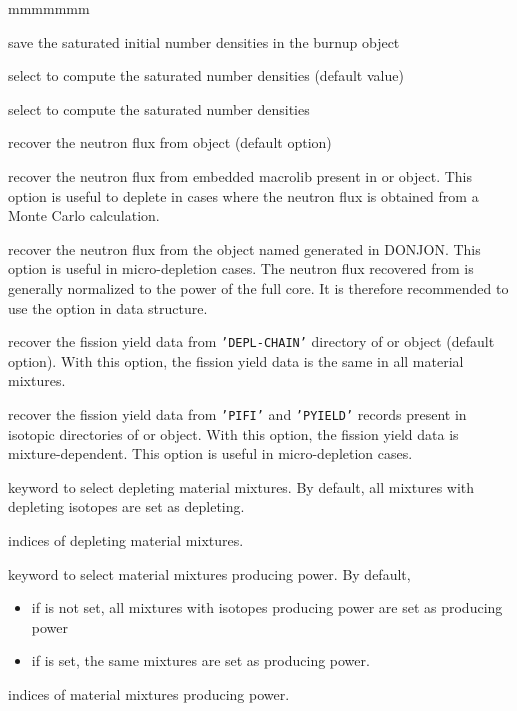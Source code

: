 \begin{ListeDeDescription}{mmmmmmm}
\item[\moc{SAT}]  save the saturated initial number densities in the {\sc burnup}
object 

\item[\moc{NODI}]  select  to compute the saturated number densities
(default value)

\item[\moc{DIRA}]  select  to compute the saturated number densities

\item[\moc{FLUX\_FLUX}]  recover the neutron flux from  object (default option)

\item[\moc{FLUX\_MAC}]  recover the neutron flux from embedded macrolib present in  or 
object. This option is useful to deplete in cases where the neutron flux is obtained from a Monte Carlo
calculation.

\item[\moc{FLUX\_POW}]  recover the neutron flux from the  object named  generated in DONJON. This option is useful in
micro-depletion cases. The neutron flux recovered from  is generally normalized to the power of the full core. It is therefore
recommended to use the  option in  data structure.

\item[\moc{CHAIN}]  recover the fission yield data from {\tt 'DEPL-CHAIN'} directory of  or 
object (default option). With this option, the fission yield data is the same in all material mixtures.

\item[\moc{PIFI}]  recover the fission yield data from {\tt 'PIFI'} and {\tt 'PYIELD'} records present in isotopic directories
of  or  object. With this option, the fission yield data is mixture-dependent. This option is useful
in micro-depletion cases.

\item[\moc{MIXB}]  keyword to select depleting material mixtures. By default, all mixtures
with depleting isotopes are set as depleting.

\item[\dusa{mixbrn}] indices of depleting material mixtures.

\item[\moc{MIXP}]  keyword to select material mixtures producing power. By default, 
\begin{itemize}
\item if  is not set, all mixtures with isotopes producing power are set as producing power
\item if  is set, the same mixtures  are set as producing power.
\end{itemize}

\item[\dusa{mixpwr}] indices of material mixtures producing power.

\end{ListeDeDescription}

